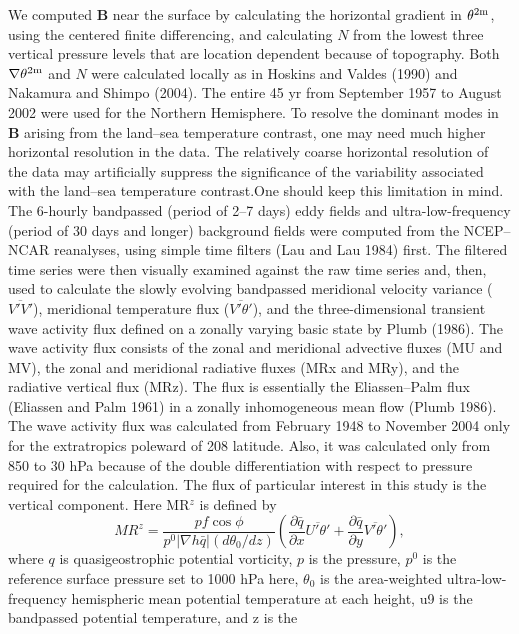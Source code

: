 \documentclass[twocol]{ametsocv6.2}
\begin{document}
We computed $\mathbf{B}$ near the surface by calculating the
horizontal gradient in $\theta^{2{\textrm m}}$, using the centered finite differencing,
and calculating $N$ from the lowest three vertical
pressure levels that are location dependent because of
topography. Both $\nabla\theta^{2{\textrm m}}$ and $N$ were calculated locally as in
Hoskins and Valdes (1990) and Nakamura and Shimpo
(2004). The entire 45 yr from September 1957 to August
2002 were used for the Northern Hemisphere. To resolve
the dominant modes in $\mathbf{B}$ arising from the land--sea temperature
contrast, one may need much higher horizontal
resolution in the data. The relatively coarse horizontal
resolution of the data may artificially suppress the significance
of the variability associated with the land--sea temperature
contrast.One should keep this limitation in mind.
The 6-hourly bandpassed (period of 2--7 days) eddy
fields and ultra-low-frequency (period of 30 days and longer)
background fields were computed from the NCEP--
NCAR reanalyses, using simple time filters (Lau and Lau
1984) first. The filtered time series were then visually examined
against the raw time series and, then, used to calculate
the slowly evolving bandpassed meridional velocity
variance ($\overline{V'V'}$), meridional temperature flux ($\overline{V'\theta'}$), and
the three-dimensional transient wave activity flux defined
on a zonally varying basic state by Plumb (1986). The wave
activity flux consists of the zonal and meridional advective
fluxes (MU and MV), the zonal and meridional
radiative fluxes (MRx and MRy), and the radiative vertical
flux (MRz). The flux is essentially the Eliassen--Palm
flux (Eliassen and Palm 1961) in a zonally inhomogeneous
mean flow (Plumb 1986). The wave activity flux was calculated
from February 1948 to November 2004 only for
the extratropics poleward of 208 latitude. Also, it was
calculated only from 850 to 30 hPa because of the double
differentiation with respect to pressure required for the
calculation. The flux of particular interest in this study is
the vertical component. Here MR$^z$ is defined by
\[
MR^z=
\frac{
pf \cos\phi}
{p^0|\nabla h\bar q|(d\theta_0/dz)}
\left(\frac{\partial\bar q}{\partial x}
\overline{U'\theta'} +
\frac{\partial\bar q}{\partial y}
\overline{V'\theta'}\right), 
\]
where $q$ is quasigeostrophic potential vorticity, $p$ is the
pressure, $p^0$ is the reference surface pressure set to
1000 hPa here, $\theta_0$ is the area-weighted ultra-low-frequency
hemispheric mean potential temperature at each height,
u9 is the bandpassed potential temperature, and z is the
\end{document}
